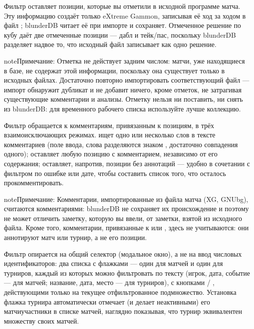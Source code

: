\documentclass[letterpaper,10pt,russian]{sphinxmanual}
\begin{document}
\sphinxAtStartPar
Фильтр  оставляет позиции, которые вы отметили в исходной программе матча. Эту информацию создаёт только eXtreme Gammon, записывая её ход за ходом в файл ; blunderDB читает её при импорте и сохраняет. Отмеченное решение по кубу даёт две отмеченные позиции — дабл и тейк/пас, поскольку blunderDB разделяет надвое то, что исходный файл записывает как одно решение.

\begin{sphinxadmonition}{note}{Примечание:}
\sphinxAtStartPar
Отметка не действует задним числом: матчи, уже находящиеся в базе, не содержат этой информации, поскольку она существует только в исходных файлах. Достаточно повторно импортировать соответствующий файл  — импорт обнаружит дубликат и не добавит ничего, кроме отметок, не затрагивая существующие комментарии и анализы. Отметку нельзя ни поставить, ни снять из blunderDB: для временного рабочего списка используйте лучше коллекцию.
\end{sphinxadmonition}

\sphinxAtStartPar
Фильтр  обращается к комментариям, привязанным к позициям, в трёх взаимоисключающих режимах.  ищет одно или несколько слов в тексте комментариев (поле ввода, слова разделяются знаком \sphinxcode{\sphinxupquote{;}}, достаточно совпадения одного);  оставляет любую позицию с комментарием, независимо от его содержания;  оставляет, напротив, позиции без аннотаций — удобно в сочетании с фильтром по ошибке или дате, чтобы составить список того, что осталось прокомментировать.

\begin{sphinxadmonition}{note}{Примечание:}
\sphinxAtStartPar
Комментарии, импортированные из файла матча (XG, GNUbg), считаются комментариями: blunderDB не сохраняет их происхождение и поэтому не может отличить заметку, которую вы ввели, от заметки, взятой из исходного файла. Кроме того, комментарии, привязанные к  или , здесь не учитываются: они аннотируют матч или турнир, а не его позиции.
\end{sphinxadmonition}

\sphinxAtStartPar
Фильтр  опирается на общий селектор (модальное окно), а не на ввод числовых идентификаторов: два списка с флажками — один для матчей и один для турниров, каждый из которых можно фильтровать по тексту (игрок, дата, событие — для матчей; название, дата, место — для турниров), с кнопками  / , действующими только на текущее отфильтрованное подмножество. Установка флажка турнира автоматически отмечает (и делает неактивными) его матчи\sphinxhyphen{}участники в списке матчей, наглядно показывая, что турнир эквивалентен множеству своих матчей.
\end{document}
